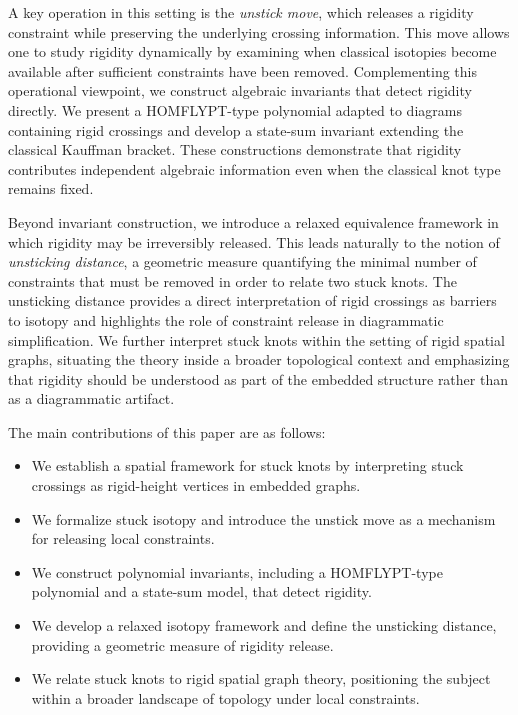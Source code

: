 \documentclass[11pt,a4paper]{article}
\theoremstyle{plain}
\theoremstyle{definition}
\begin{document}
\medskip

A key operation in this setting is the \emph{unstick move}, which releases a rigidity constraint while preserving the underlying crossing information. This move allows one to study rigidity dynamically by examining when classical isotopies become available after sufficient constraints have been removed. Complementing this operational viewpoint, we construct algebraic invariants that detect rigidity directly. We present a HOMFLYPT-type polynomial adapted to diagrams containing rigid crossings and develop a state-sum invariant extending the classical Kauffman bracket. These constructions demonstrate that rigidity contributes independent algebraic information even when the classical knot type remains fixed.

Beyond invariant construction, we introduce a relaxed equivalence framework in which rigidity may be irreversibly released. This leads naturally to the notion of \emph{unsticking distance}, a geometric measure quantifying the minimal number of constraints that must be removed in order to relate two stuck knots. The unsticking distance provides a direct interpretation of rigid crossings as barriers to isotopy and highlights the role of constraint release in diagrammatic simplification. We further interpret stuck knots within the setting of rigid spatial graphs, situating the theory inside a broader topological context and emphasizing that rigidity should be understood as part of the embedded structure rather than as a diagrammatic artifact.

\medskip

The main contributions of this paper are as follows:

\begin{itemize}
\item We establish a spatial framework for stuck knots by interpreting stuck crossings as rigid-height vertices in embedded graphs.

\item We formalize stuck isotopy and introduce the unstick move as a mechanism for releasing local constraints.

\item We construct polynomial invariants, including a HOMFLYPT-type polynomial and a state-sum model, that detect rigidity.

\item We develop a relaxed isotopy framework and define the unsticking distance, providing a geometric measure of rigidity release.

\item We relate stuck knots to rigid spatial graph theory, positioning the subject within a broader landscape of topology under local constraints.
\end{itemize}
\end{document}
